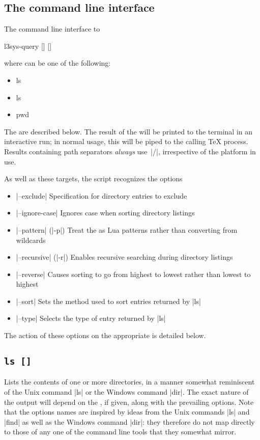 \documentclass{l3doc}
\begin{document}
\begin{documentation}
\section{The command line interface}

The command line interface to 
\begin{center}
  \ttfamily
  l3sys-query  [] []
\end{center}
where \texttt{} can be one of the following:
\begin{itemize}[noitemsep]\ttfamily
  \item ls
  \item ls 
  \item pwd
\end{itemize}
The  are described below. The result of the  will be printed
to the terminal in an interactive run; in normal usage, this will be piped to
the calling \TeX{} process. Results containing path separators \emph{always}
use~|/|, irrespective of the platform in use.

As well as these targets, the script recognizes the options
\begin{itemize}
  \item |--exclude| Specification for directory entries to exclude
  \item |--ignore-case| Ignores case when sorting directory listings
  \item |--pattern| (|-p|) Treat the  as Lua patterns rather
    than converting from wildcards
  \item |--recursive| (|-r|) Enables recursive searching during directory
    listings
  \item |--reverse| Causes sorting to go from highest to lowest rather
    than lowest to highest
  \item |--sort| Sets the method used to sort entries returned by |ls|
  \item |--type| Selects the type of entry returned by |ls|
\end{itemize}
The action of these options on the appropriate  is detailed below.

\subsection{\texttt{ls []}}

Lists the contents of one or more directories, in a manner somewhat reminiscent
of the Unix command |ls| or the Windows command |dir|. The exact nature of the
output will depend on the , if given, along with the prevailing
options. Note that the options names are inspired by ideas from the Unix
commands |ls| and |find| as well as the Windows command |dir|: they therefore do
not map directly to those of any one of the command line tools that they
somewhat mirror.


\end{documentation}
\end{document}
